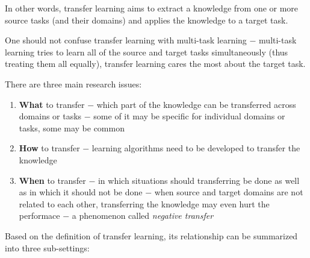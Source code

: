 \documentclass[a4paper,twocolumn]{article}
\begin{document}
In other words, transfer learning aims to extract a knowledge from one or more source tasks (and their domains) and applies the knowledge to a target task.

One should not confuse transfer learning with multi-task learning $-$ multi-task learning tries to learn all of the source and target tasks simultaneously (thus treating them all equally), transfer learning cares the most about the target task.

There are three main research issues:
\begin{enumerate}
    \item \textbf{What} to transfer $-$ which part of the knowledge can be transferred across domains or tasks $-$ some of it may be specific for individual domains or tasks, some may be common
    \item \textbf{How} to transfer $-$ learning algorithms need to be developed to transfer the knowledge
    \item \textbf{When} to transfer $-$ in which situations should transferring be done as well as in which it should not be done $-$ when source and target domains are not related to each other, transferring the knowledge may even hurt the performace $-$ a phenomenon called \textit{negative transfer}
\end{enumerate}

Based on the definition of transfer learning, its relationship can be summarized into three sub-settings:
\end{document}
